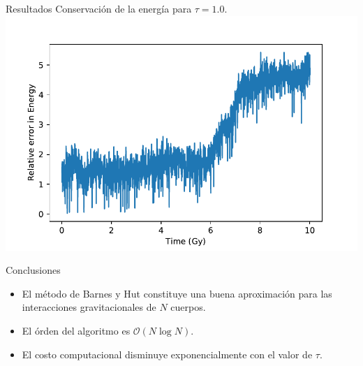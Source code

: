 \documentclass{beamer}
\begin{document}
\begin{frame}{Resultados}
	Conservaci\'on de la energ\'ia para $\tau = 1.0$.
	\centering
	\includegraphics[width=0.8\linewidth]{sources/images/energy.pdf}
\end{frame}
\begin{frame}{Conclusiones}
	\begin{itemize}
		\item El m\'etodo de Barnes y Hut constituye una buena aproximaci\'on para las interacciones gravitacionales de $N$ cuerpos.
		
		\item El \'orden del algoritmo es $\mathcal{O}(N\log N)$.
		
		\item El costo computacional disminuye exponencialmente con el valor de $\tau$.
	\end{itemize}
\end{frame}
\end{document}
